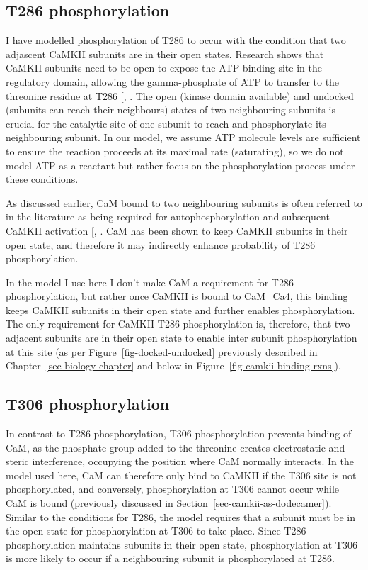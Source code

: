 \documentclass[
  11pt,
  letterpaper,
]{scrreprt}
\begin{document}
\subsection{T286 phosphorylation}\label{t286-phosphorylation}

I have modelled phosphorylation of T286 to occur with the condition that
two adjascent CaMKII subunits are in their open states. Research shows
that CaMKII subunits need to be open to expose the ATP binding site in
the regulatory domain, allowing the gamma-phosphate of ATP to transfer
to the threonine residue at T286
{[},
\citeproc{ref-hoffman2011Investigation}{469}{]}. The open (kinase domain
available) and undocked (subunits can reach their neighbours) states of
two neighbouring subunits is crucial for the catalytic site of one
subunit to reach and phosphorylate its neighbouring subunit. In our
model, we assume ATP molecule levels are sufficient to ensure the
reaction proceeds at its maximal rate (saturating), so we do not model
ATP as a reactant but rather focus on the phosphorylation process under
these conditions.

As discussed earlier, CaM bound to two neighbouring subunits is often
referred to in the literature as being required for autophosphorylation
and subsequent CaMKII activation
{[},
\citeproc{ref-nicoll2005Synaptic}{193}{]}. CaM has been shown to keep
CaMKII subunits in their open state, and therefore it may indirectly
enhance probability of T286 phosphorylation.

In the model I use here I don't make CaM a requirement for T286
phosphorylation, but rather once CaMKII is bound to CaM\_Ca4, this
binding keeps CaMKII subunits in their open state and further enables
phosphorylation. The only requirement for CaMKII T286 phosphorylation
is, therefore, that two adjacent subunits are in their open state to
enable inter subunit phosphorylation at this site (as per
Figure~\ref{fig-docked-undocked} previously described in
Chapter~\ref{sec-biology-chapter} and below in
Figure~\ref{fig-camkii-binding-rxns}).

\subsection{T306 phosphorylation}\label{t306-phosphorylation}

In contrast to T286 phosphorylation, T306 phosphorylation prevents
binding of CaM, as the phosphate group added to the threonine creates
electrostatic and steric interference, occupying the position where CaM
normally interacts. In the model used here, CaM can therefore only bind
to CaMKII if the T306 site is not phosphorylated, and conversely,
phosphorylation at T306 cannot occur while CaM is bound (previously
discussed in Section~\ref{sec-camkii-as-dodecamer}). Similar to the
conditions for T286, the model requires that a subunit must be in the
open state for phosphorylation at T306 to take place. Since T286
phosphorylation maintains subunits in their open state, phosphorylation
at T306 is more likely to occur if a neighbouring subunit is
phosphorylated at T286.
\end{document}
